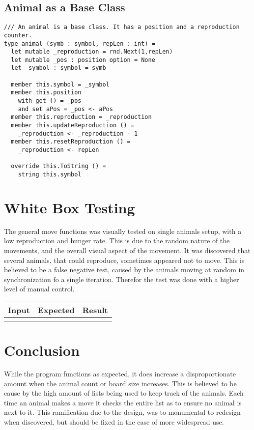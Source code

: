 \documentclass{article}
\begin{document}
    \subsection{Animal as a Base Class}
		\lstset{language=FSharp}

		\begin{lstlisting}
/// An animal is a base class. It has a position and a reproduction counter.
type animal (symb : symbol, repLen : int) =
  let mutable _reproduction = rnd.Next(1,repLen)
  let mutable _pos : position option = None
  let _symbol : symbol = symb

  member this.symbol = _symbol
  member this.position
    with get () = _pos
    and set aPos = _pos <- aPos
  member this.reproduction = _reproduction
  member this.updateReproduction () =
    _reproduction <- _reproduction - 1
  member this.resetReproduction () =
    _reproduction <- repLen

  override this.ToString () =
    string this.symbol
		\end{lstlisting}
		
         
    \section{White Box Testing}
    The general move functions was visually tested on single animals setup, with a low reproduction and hunger rate. This is due to the random nature of the movements, and the overall visual aspect of the movement. It was discovered that several animals, that could reproduce, sometimes appeared not to move. This is believed to be a false negative test, caused by the animals moving at random in synchronization fo a single iteration. Therefor the test was done with a higher level of manual control. \newline
   	   \begin{tabular}{|c|c|c|}
   	   		\hline
   	   		Input & Expected & Result\\
   	   		\hline
   	   		&&\\
   	   		\hline
   	   \end{tabular}
    \section{Conclusion}
     While the program functions as expected, it does increase a disproportionate amount when the animal count or board size increases. This is believed to be cause by the high amount of lists being used to keep track of the animals. Each time an animal makes a move it checks the entire list as to ensure no animal is next to it. This ramification due to the design, was to monumental to redesign when discovered, but should be fixed in the case of more widespread use. 
\end{document}
